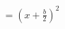 \documentclass[preview]{standalone}
\begin{document}
\begin{align*}
= \left(x + \frac{b}{2}\right)^2
\end{align*}
\end{document}
